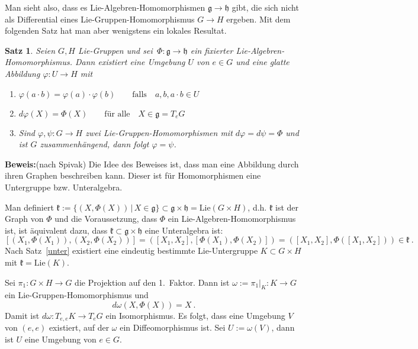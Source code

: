 \documentclass[12pt,a4paper]{article}
\def\Lie{\mathrm{Lie}}
\def\g{\mathfrak{g}}
\def\k{\mathfrak{k}}
\def\h{\mathfrak{h}}
\newtheorem{Satz}[Lemma]{Satz}
\def\proof{\noindent\textbf{Beweis:}\quad}
\begin{document}
\medskip

Man sieht also, dass es Lie-Algebren-Homomorphismen $\g \rightarrow \h$ gibt, die sich nicht als
Differential eines Lie-Gruppen-Homomorphismus $G\rightarrow H$ ergeben. Mit dem folgenden Satz
hat man aber wenigstens ein lokales Resultat.

\bigskip

\begin{Satz}\label{hom}
Seien $G, H$ Lie-Gruppen und sei $\,\Phi : \g \rightarrow \h$ ein fixierter Lie-Algebren-Homomorphismus. Dann
existiert eine Umgebung $U$ von $e\in G$ und eine glatte Abbildung $\varphi : U \rightarrow H$ mit
\begin{enumerate}
\item\label{11}
$
\varphi (a \cdot b) = \varphi(a) \cdot \varphi(b)
\qquad \mbox{falls}\quad a, b, a\cdot b \in U
$
\item\label{22}
$
d\varphi(X) = \Phi(X)
\qquad \mbox{f\"ur alle}\quad X\in \g= T_eG
$
\item
Sind $\varphi, \psi : G\rightarrow H$ zwei Lie-Gruppen-Homomorphismen mit $d\varphi = d\psi = \Phi$
und ist $G$ zusammenh\"angend, dann folgt $\varphi = \psi$.
\end{enumerate}
\end{Satz}
\proof (nach Spivak)
Die Idee des Beweises ist, dass man eine Abbildung durch ihren Graphen beschreiben kann. Dieser ist
f\"ur Homomorphismen eine Untergruppe bzw. Unteralgebra.

\medskip


Man definiert $\k := \{ (X, \Phi(X)) \,|\, X \in \g \} \subset \g \times \h = \Lie(G \times H)$, d.h.
$\k$ ist der Graph von $\Phi$ und die Voraussetzung, dass $\Phi$ ein Lie-Algebren-Homomorphismus ist,
ist \"aquivalent dazu, dass $\k \subset \g \times \h$ eine Unteralgebra ist:
$$
[(X_1,\Phi(X_1)),(X_2,\Phi(X_2))]
=
([X_1,X_2], [\Phi(X_1), \Phi(X_2)])
=
([X_1,X_2], \Phi([X_1,X_2]))\in \k \ .
$$
Nach Satz~\ref{unter} existiert eine eindeutig bestimmte Lie-Untergruppe $K\subset G\times H$ mit
$\k = \Lie(K)$.

\medskip

Sei $\pi_1: G \times H \rightarrow G$ die Projektion auf den 1.~Faktor. Dann ist
$\omega := \left. \pi_1\right|_K : K \rightarrow G$ ein Lie-Gruppen-Homomorphismus und
$$
d\omega (X, \Phi(X)) = X \ .
$$
Damit ist $d\omega : T_{e,e}K \rightarrow T_eG$ ein Isomorphismus. Es folgt, dass eine Umgebung
$V$ von $(e,e)$ existiert, auf der $\omega$ ein Diffeomorphismus ist. Sei $U:=\omega(V)$, dann
ist $U$ eine Umgebung von $e\in G$.
\end{document}
